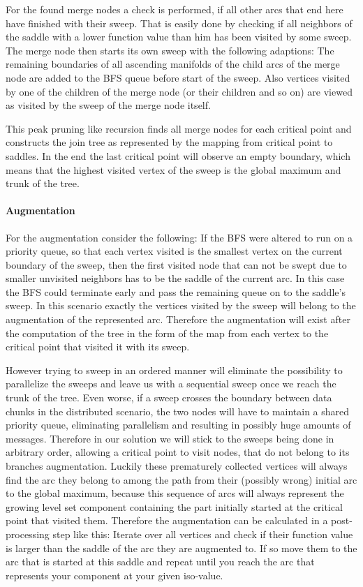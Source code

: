 \documentclass{scrartcl}
\begin{document}
For the found merge nodes a check is performed, if all other arcs that end here have finished with their sweep. That is easily done by checking if all neighbors of the saddle with a lower function value than him has been visited by some sweep. The merge node then starts its own sweep with the following adaptions: The remaining boundaries of all ascending manifolds of the child arcs of the merge node are added to the BFS queue before start of the sweep. Also vertices visited by one of the children of the merge node (or their children and so on) are viewed as visited by the sweep of the merge node itself. 

This peak pruning like recursion finds all merge nodes for each critical point and constructs the join tree as represented by the mapping from critical point to saddles. In the end the last critical point will observe an empty boundary, which means that the highest visited vertex of the sweep is the global maximum and trunk of the tree. 

\paragraph{Augmentation}
For the augmentation consider the following: If the BFS were altered to run on a priority queue, so that each vertex visited is the smallest vertex on the current boundary of the sweep, then the first visited node that can not be swept due to smaller unvisited neighbors has to be the saddle of the current arc. In this case the BFS could terminate early and pass the remaining queue on to the saddle's sweep. In this scenario exactly the vertices visited by the sweep will belong to the augmentation of the represented arc. Therefore the augmentation will exist after the computation of the tree in the form of the map from each vertex to the critical point that visited it with its sweep. 

However trying to sweep in an ordered manner will eliminate the possibility to parallelize the sweeps and leave us with a sequential sweep once we reach the trunk of the tree. Even worse, if a sweep crosses the boundary between data chunks in the distributed scenario, the two nodes will have to maintain a shared priority queue, eliminating parallelism and resulting in possibly huge amounts of messages. Therefore in our solution we will stick to the sweeps being done in arbitrary order, allowing a critical point to visit nodes, that do not belong to its branches augmentation. Luckily these prematurely collected vertices will always find the arc they belong to among the path from their (possibly wrong) initial arc to the global maximum, because this sequence of arcs will always represent the growing level set component containing the part initially started at the critical point that visited them. Therefore the augmentation can be calculated in a post-processing step like this: Iterate over all vertices and check if their function value is larger than the saddle of the arc they are augmented to. If so move them to the arc that is started at this saddle and repeat until you reach the arc that represents your component at your given iso-value. 
\end{document}
